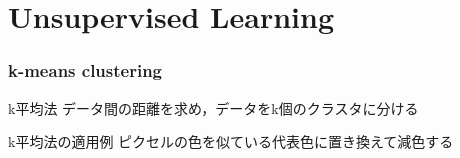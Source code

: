 \documentclass[dvipdfmx,platex]{beamer}
\begin{document}
\part{Unsupervised Learning}
\section{k-means clustering}
\begin{frame}{k平均法}
  データ間の距離を求め，データをk個のクラスタに分ける
\end{frame}
\begin{frame}{k平均法の適用例}
  ピクセルの色を似ている代表色に置き換えて減色する
\end{frame}
\end{document}
